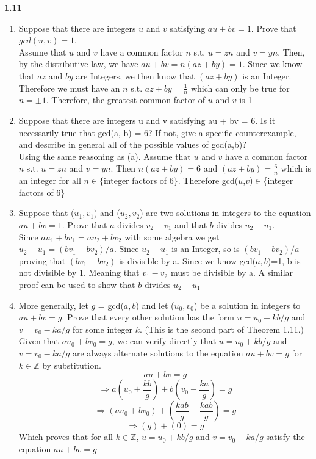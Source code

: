 \documentclass[a4paper, 11pt]{article}
\begin{document}
\noindent \textbf{1.11}
\begin{enumerate}[label=(\alph*)]
    \item Suppose that there are integers $u$ and $v$ satisfying $au + bv = 1$. Prove that $gcd(u, v) = 1$.\\
    
        Assume that $u$ and $v$ have a common factor $n$ s.t. $u=zn$ and $v=yn$. Then, by the distributive law, we have $au + bv = n\left( az+by \right) = 1$. Since we know that $az$ and $by$ are Integers, we then know that $(az + by)$ is an Integer. Therefore we must have an $n$ s.t. $az+by = \frac{1}{n}$ which can only be true for $n=\pm 1$. Therefore, the greatest common factor of $u$ and $v$ is 1
    \item Suppose that there are integers u and v satisfying au + bv = 6. Is it necessarily true that gcd(a, b) = 6? If not, give a specific counterexample, and describe in general all of the possible values of gcd(a,b)?\\
    
        Using the same reasoning as (a). Assume that $u$ and $v$ have a common factor $n$ s.t. $u=zn$ and $v=yn$.  Then $n\left( az+by \right) = 6$ and $\left( az+by \right) = \frac{6}{n}$ which is an integer for all $n \in \{$integer factors of 6$\}$. Therefore gcd($u$,$v$)$\in$\{integer factors of 6\}
    \item Suppose that ($u_1,v_1$) and ($u_2,v_2$) are two solutions in integers to the equation $au+bv = 1$. Prove that $a$ divides $v_2 - v_1$ and that $b$ divides $u_2 - u_1$.\\
    
        Since $au_1 + bv_1 = au_2 + bv_2$ with some algebra we get $u_2 - u_1 = (bv_1 - bv_2)/a$. Since $u_2 - u_1$ is an Integer, so is $(bv_1 - bv_2)/a$ proving that $(bv_1 - bv_2)$ is divisible by a. Since we know gcd($a,b$)=1, b is not divisible by 1. Meaning that $v_1 - v_2$ must be divisible by a.
        A similar proof can be used to show that $b$ divides $u_2 - u_1$
    \item More generally, let $g$ = gcd($a,b$) and let ($u_0,v_0$) be a solution in integers to $au + bv = g$. Prove that every other solution has the form $u = u_0 + kb/g$ and $v = v_0 − ka/g$ for some integer $k$. (This is the second part of Theorem 1.11.)\\
    
        Given that $au_0 + bv_0 = g$, we can verify directly that $u = u_0 + kb/g$ and $v = v_0 − ka/g$ are always alternate solutions to the equation $au+bv=g$ for $k \in\mathbb{Z}$ by substitution.
        $$au+bv=g$$
        $$\Rightarrow a \left( u_0+\frac{kb}{g}\right)+ b \left( v_0 -\frac{ka}{g}\right)=g$$
        $$\Rightarrow \left( au_0 + bv_0\right) + \left(\frac{kab}{g} - \frac{kab}{g}\right) =g$$
        $$\Rightarrow \left( g\right)+ \left( 0\right) = g$$
        Which proves that for all $k \in\mathbb{Z}$, $u  = u_0 + kb/g$ and $v = v_0 - ka/g$ satisfy the equation $au+bv=g$
\end{enumerate}
\end{document}
